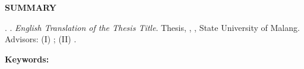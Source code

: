 %
%

\clearpage
{}

\begin{center}
    \bfseries SUMMARY
\end{center}

\begin{singlespace}

\noindent \penulis. \bulantahun. \textit{English Translation of the Thesis Title}. Thesis, \jurusan, \fakultas, State University of Malang. Advisors: (I) \pembimbingSatu; (II) \pembimbingDua.

\vspace{0.5\baselineskip}
\noindent \textbf{Keywords:} \katakunciEn

\vspace{\baselineskip}
\blindtext

\end{singlespace}
\clearpage
